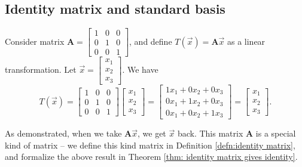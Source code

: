 \documentclass[]{book}
\newcommand{\vecxxx}[1][x]{\ensuremath{\begin{bmatrix}
#1_1 \\
#1_2 \\
#1_3
\end{bmatrix}}}
\newcommand{\mat}[1]{\ensuremath{\mathbf{#1}}}
\begin{document}
\subsection{Identity matrix and standard basis}
Consider matrix $\mat{A}=\begin{bmatrix}1&0&0\\0&1&0\\0&0&1\end{bmatrix}$, and define $T(\vec{x})=\mat{A}\vec{x}$ as a linear transformation. Let $\vec{x}=\vecxxx$. We have
\[
    T(\vec{x}) = \begin{bmatrix}1&0&0\\0&1&0\\0&0&1\end{bmatrix} \vecxxx 
    = \begin{bmatrix}1x_1+0x_2+0x_3 \\ 0x_1 + 1x_2 + 0x_3 \\ 0x_1 + 0x_2 + 1x_3\end{bmatrix} 
    = \vecxxx.
\]

As demonstrated, when we take $\mat{A}\vec{x}$, we get $\vec{x}$ back. This matrix $\mat{A}$ is a special kind of matrix -- we  define this kind matrix in Definition \ref{defn:identity matrix}, and formalize the above result in Theorem \ref{thm: identity matrix gives identity}.
\end{document}
